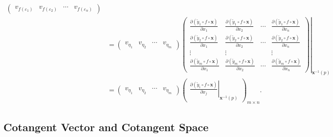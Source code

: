 \documentclass{report}
\begin{document}
{\[\begin{aligned}
\begin{pmatrix}
            v_{f(\varepsilon_1)}&v_{f(\varepsilon_2)}&\cdots&v_{f(\varepsilon_n)}
            \end{pmatrix}\\
            &=
            \begin{pmatrix}
            v_{\eta_1}&v_{\eta_2}&\cdots&v_{\eta_m}
            \end{pmatrix}
            \left.\begin{pmatrix}
                \frac{\partial(\tilde{y}_1 \circ f\circ\mathbf{x})}{\partial x_1}&\frac{\partial(\tilde{y}_1 \circ f\circ\mathbf{x})}{\partial x_2}&\cdots&\frac{\partial(\tilde{y}_1 \circ f\circ\mathbf{x})}{\partial x_n}\\
                \frac{\partial(\tilde{y}_2 \circ f\circ\mathbf{x})}{\partial x_1}&\frac{\partial(\tilde{y}_2 \circ f\circ\mathbf{x})}{\partial x_2}&\cdots&\frac{\partial(\tilde{y}_2 \circ f\circ\mathbf{x})}{\partial x_n}\\
                \vdots&\vdots&&\vdots\\
                \frac{\partial(\tilde{y}_m \circ f\circ\mathbf{x})}{\partial x_1}&\frac{\partial(\tilde{y}_m \circ f\circ\mathbf{x})}{\partial x_2}&\cdots&\frac{\partial(\tilde{y}_m \circ f\circ\mathbf{x})}{\partial x_n}
            \end{pmatrix}\right|_{\mathbf{x}^{-1}(p)}\\
            &=
            \begin{pmatrix}
            v_{\eta_1}&v_{\eta_2}&\cdots&v_{\eta_m}
            \end{pmatrix}
            \begin{pmatrix}
           \left.\frac{\partial(\tilde{y}_i \circ f\circ\mathbf{x})}{\partial x_j}\right|_{\mathbf{x}^{-1}(p)}
           \end{pmatrix}_{m\times n}.
        \end{aligned}
    \]
}

\subsection{Cotangent Vector and Cotangent Space}
\end{document}

